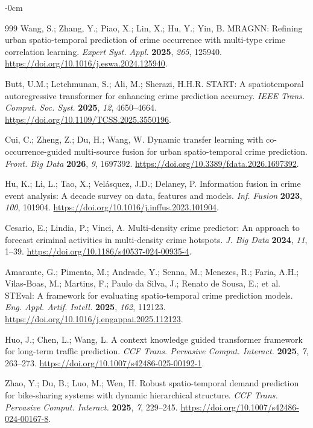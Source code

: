 \documentclass[applsci,article,accept,moreauthors]{Definitions/mdpi}
\begin{document}
\begin{adjustwidth}{-\extralength}{0cm}
\begin{thebibliography}{999}
Wang, S.; Zhang, Y.; Piao, X.; Lin, X.; Hu, Y.; Yin, B. MRAGNN: Refining urban spatio-temporal prediction of crime occurrence with multi-type crime correlation learning. \emph{Expert Syst. Appl.} \textbf{2025}, \emph{265}, 125940. \url{https://doi.org/10.1016/j.eswa.2024.125940}.

Butt, U.M.; Letchmunan, S.; Ali, M.; Sherazi, H.H.R. START: A
spatiotemporal autoregressive transformer for enhancing crime prediction
accuracy. \emph{IEEE Trans. Comput. Soc. Syst.} \textbf{2025}, \emph{12},
4650--4664. \url{https://doi.org/10.1109/TCSS.2025.3550196}.

Cui, C.; Zheng, Z.; Du, H.; Wang, W. Dynamic transfer learning with co-occurrence-guided multi-source fusion for urban spatio-temporal crime prediction. \emph{Front. Big Data} \textbf{2026}, \emph{9}, 1697392. \url{https://doi.org/10.3389/fdata.2026.1697392}.

Hu, K.; Li, L.; Tao, X.; Vel\'asquez, J.D.; Delaney, P. Information fusion in crime event analysis: A decade survey on data, features and models. \emph{Inf. Fusion} \textbf{2023}, \emph{100}, 101904. \url{https://doi.org/10.1016/j.inffus.2023.101904}.

Cesario, E.; Lindia, P.; Vinci, A. Multi-density crime predictor: An approach to forecast criminal activities in multi-density crime hotspots. \emph{J. Big Data} \textbf{2024}, \emph{11}, 1--39. \url{https://doi.org/10.1186/s40537-024-00935-4}.

Amarante, G.; Pimenta, M.; Andrade, Y.; Senna, M.; Menezes, R.; Faria, A.H.; Vilas-Boas, M.; Martins, F.; Paulo da Silva, J.; Renato de Sousa, E.; et al. STEval: A framework for evaluating spatio-temporal crime prediction models. \emph{Eng. Appl. Artif. Intell.} \textbf{2025}, \emph{162}, 112123. \url{https://doi.org/10.1016/j.engappai.2025.112123}.

Huo, J.; Chen, L.; Wang, L. A context knowledge guided transformer framework
for long-term traffic prediction. \emph{CCF Trans. Pervasive Comput.
Interact.} \textbf{2025}, \emph{7}, 263--273.
\url{https://doi.org/10.1007/s42486-025-00192-1}.

Zhao, Y.; Du, B.; Luo, M.; Wen, H. Robust spatio-temporal demand prediction
for bike-sharing systems with dynamic hierarchical structure.
\emph{CCF Trans. Pervasive Comput. Interact.} \textbf{2025}, \emph{7},
229--245. \url{https://doi.org/10.1007/s42486-024-00167-8}.


\end{thebibliography}
\end{adjustwidth}
\end{document}
